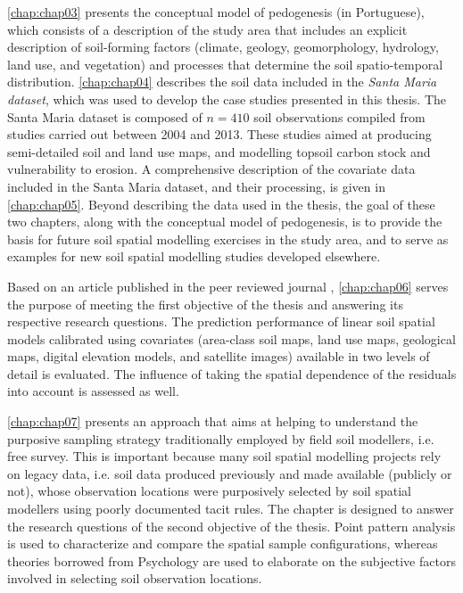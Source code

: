 \autoref{chap:chap03} presents the conceptual model of pedogenesis (in Portuguese), which consists of a 
description of the study area that includes an explicit description of soil-forming factors (climate, geology, 
geomorphology, hydrology, land use, and vegetation) and processes that determine the soil spatio-temporal 
distribution. \autoref{chap:chap04} describes the soil data included in the \emph{Santa Maria dataset}, which 
was used to develop the case studies presented in this thesis. The Santa Maria dataset is composed of 
$n = 410$ soil observations compiled from studies carried out between \num{2004} and \num{2013}. These studies 
aimed at producing semi-detailed soil and land use maps, and modelling topsoil carbon stock and vulnerability 
to erosion. A comprehensive description of the covariate data included in the Santa Maria dataset, and their 
processing, is given in \autoref{chap:chap05}. Beyond describing the data used in the thesis, the goal of these 
two chapters, along with the conceptual model of pedogenesis, is to provide the basis for future soil spatial 
modelling exercises in the study area, and to serve as examples for new soil spatial modelling studies 
developed elsewhere.

Based on an article published in the peer reviewed journal \geoderma, \autoref{chap:chap06} serves the purpose 
of meeting the first objective of the thesis and answering its respective research questions. The 
prediction performance of linear soil spatial models calibrated using covariates (area-class soil maps, land 
use maps, geological maps, digital elevation models, and satellite images) available in two levels of detail 
is evaluated. The influence of taking the spatial dependence of the residuals into account is assessed as 
well. 

\autoref{chap:chap07} presents an approach that aims at helping to understand the purposive sampling strategy 
traditionally employed by field soil modellers, i.e. free survey. This is important because many soil 
spatial modelling projects rely on legacy data, i.e. soil data produced previously and made available (publicly 
or not), whose observation locations were purposively selected by soil spatial modellers using poorly 
documented tacit rules. The chapter is designed to answer the research questions of the second objective of the 
thesis. Point pattern analysis is used to characterize and compare the spatial sample configurations, whereas 
theories borrowed from Psychology are used to elaborate on the subjective factors involved in selecting soil 
observation locations.

